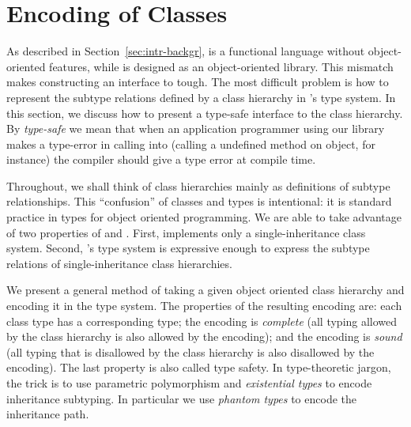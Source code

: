 \documentclass[finalversion]{usetex-v1}
\begin{document}

\section{Encoding of Classes}
\label{sec:encoding-classes}

As described in Section~\ref{sec:intr-backgr}, \sml is a functional
language without object-oriented features, while \gtk is designed as an
object-oriented library.  This mismatch makes constructing an \sml
interface to \gtk tough.  The most difficult problem is how to represent the
subtype relations defined by a class hierarchy in \sml's type system.
In this section, we discuss how to present a
type-safe \sml interface to the \gtk class hierarchy.  By \emph{type-safe} we
mean that when an \sml application programmer using our library
makes a type-error in calling into \gtk (calling a undefined
method on object, for instance) the \sml compiler should give a
type error at compile time.

Throughout, we shall think of class hierarchies mainly as definitions
of subtype relationships.  This ``confusion'' of classes and types is
intentional: it is standard practice in types for object
oriented programming.
We are able to take advantage of two properties of \gtk
and \sml.  First, \gtk implements only a single-inheritance
class system.
Second, \sml's type system is expressive enough
to express the subtype relations of single-inheritance class
hierarchies.

We present a general method of taking a given
object oriented class hierarchy and encoding it in the \sml
type system.  The properties of the resulting encoding are: each
class type has a corresponding \sml type; the encoding is
\emph{complete} (all typing allowed by the class
hierarchy is also allowed by the encoding); and the encoding is
\emph{sound} (all typing that is disallowed by the class
hierarchy is also disallowed by the encoding).  The last property is
also called type safety.  In type-theoretic jargon, the trick is to
use parametric polymorphism and \emph{existential types} to encode
inheritance subtyping.  In particular we use \emph{phantom types} to
encode the inheritance path.
\end{document}
